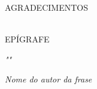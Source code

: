 \vspace*{\fill}
AGRADECIMENTOS\\
\vspace*{\baselineskip} %
\justifying


\lipsum[1]\\

\newpage
\vspace*{\fill}
EPÍGRAFE\\
\vspace*{\baselineskip} %
\begin{FlushRight}


\textit{"\lipsum[1]"}\\


\vspace*{2\baselineskip} %

\textit{Nome do autor da frase}
\end{FlushRight}


